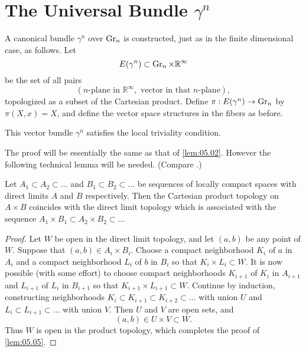 \documentclass[../main]{subfiles}
\begin{document}
\section{The Universal Bundle \texorpdfstring{$\gamma^n$}{gamma n}}\label{5.2}

A canonical bundle $\gamma^n$ over $\operatorname{Gr}_n$ is constructed, just as in the finite
dimensional case, as follows. Let 
\[
E(\gamma^n)\subset \operatorname{Gr}_n\times {\mathbb R}^\infty
\]
be the set of all pairs
\[
(n\text{-plane in }{\mathbb R}^\infty,\text{ vector in that $n$-plane}),
\]
topologized as a subset of the Cartesian product. Define $\pi: E(\gamma^n) \to \operatorname{Gr}_n$
by $\pi(X, x) = X$, and define the vector space structures in the fibers as
before.

\begin{lemma}\label{lem:05.04}
 This vector bundle $\gamma^n$ satisfies the local triviality
condition.
\end{lemma}
The proof will be essentially the same as that of \ref{lem:05.02}. However the
following technical lemma will be needed. (Compare \cite[\S18.5]{whitehead1961}.)
\begin{lemma}\label{lem:05.05} Let $A_1 \subset A_2 \subset \dots$ and $B_1 \subset B_2 \subset \dots$ be sequences
of locally compact spaces with direct limits $A$ and $B$ respectively. Then the Cartesian product topology on $A \times B$ coincides
with the direct limit topology which is associated with the sequence $A_1 \times B_1 \subset A_2 \times B_2 \subset\dots$
\end{lemma}
\begin{proof} Let $W$ be open in the direct limit topology, and let $(a, b)$ be
any point of $W$. Suppose that $(a, b) \in A_i \times B_i$. Choose a compact neighborhood $K_i$ of $a$ in $A_i$ and a compact neighborhood $L_i$ of $b$ in $B_i$
so that $K_i \times L_i \subset W$. It is now possible (with some effort) to choose compact neighborhoods $K_{i+1}$ of $K_i$ in $A_{i+1}$ and $L_{i+1}$ of $L_i$ in $B_{i+1}$ so
that $K_{i+1} \times L_{i+1}\subset  W$. Continue by induction, constructing neighborhoods
$K_i \subset K_{i+1} \subset K_{i+2} \subset\dots$ with union $U$ and $L_i \subset L_{i+1} \subset \dots$ with union $V$.
Then $U$ and $V$ are open sets, and
\[
(a, b) \in U \times V \subset W.
\]
Thus $W$ is open in the product topology, which completes the proof of \ref{lem:05.05}.
\end{proof}
\end{document}

